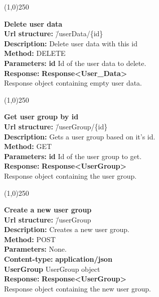 \documentclass[11pt]{article}
\begin{document}
\begin{center}\line(1,0){250}\end{center}

\begin{tabbing}
\textbf{Delete user data} \\
\textcolor{black!60}{\textbf{Url structure:}} \hspace{0.2in} \= /userData/\{id\} \\
\textcolor{black!60}{\textbf{Description:}}  \> Delete user data with this id \\
\textcolor{black!60}{\textbf{Method:}} \> DELETE \\
\textcolor{black!60}{\textbf{Parameters:}} \> \textbf{id} Id of the user data to delete. \\
\textcolor{black!60}{\textbf{Response:}} \> \textbf{Response<User\_Data>} \\
\> Response object containing empty user data.
\end{tabbing}

\begin{center}\line(1,0){250}\end{center}

\begin{tabbing}
\textbf{Get user group by id} \\
\textcolor{black!60}{\textbf{Url structure:}} \hspace{0.2in} \= /userGroup/\{id\} \\
\textcolor{black!60}{\textbf{Description:}}  \> Gets a user group based on it's id. \\
\textcolor{black!60}{\textbf{Method:}} \> GET \\
\textcolor{black!60}{\textbf{Parameters:}} \> \textbf{id} Id of the user group to get. \\
\textcolor{black!60}{\textbf{Response:}} \> \textbf{Response<UserGroup>} \\
\> Response object containing the user group.
\end{tabbing}

\begin{center}\line(1,0){250}\end{center}

\begin{tabbing}
\textbf{Create a new user group} \\
\textcolor{black!60}{\textbf{Url structure:}} \hspace{0.2in} \= /userGroup \\
\textcolor{black!60}{\textbf{Description:}}  \> Creates a new user group. \\
\textcolor{black!60}{\textbf{Method:}} \> POST \\
\textcolor{black!60}{\textbf{Parameters:}} \> None. \\
\textcolor{black!60}{\textbf{Content-type:}} \> \textbf{application/json} \\
\> \textbf{UserGroup} UserGroup object \\
\textcolor{black!60}{\textbf{Response:}} \> \textbf{Response<UserGroup>} \\
\> Response object containing the new user group.
\end{tabbing}
\end{document}
